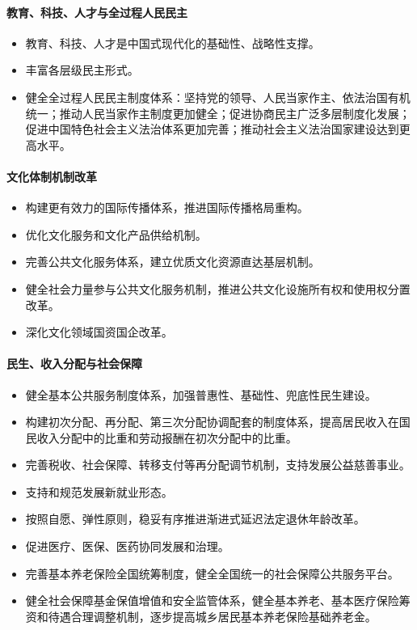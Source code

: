 \documentclass[12pt,a4paper]{ctexart}
\begin{document}
\paragraph{教育、科技、人才与全过程人民民主}

\begin{itemize}
\item 教育、科技、人才是中国式现代化的基础性、战略性支撑。
\item 丰富各层级民主形式。
\item 健全全过程人民民主制度体系：坚持党的领导、人民当家作主、依法治国有机统一；推动人民当家作主制度更加健全；促进协商民主广泛多层制度化发展；促进中国特色社会主义法治体系更加完善；推动社会主义法治国家建设达到更高水平。
\end{itemize}

\paragraph{文化体制机制改革}

\begin{itemize}
\item 构建更有效力的国际传播体系，推进国际传播格局重构。
\item 优化文化服务和文化产品供给机制。
\item 完善公共文化服务体系，建立优质文化资源直达基层机制。
\item 健全社会力量参与公共文化服务机制，推进公共文化设施所有权和使用权分置改革。
\item 深化文化领域国资国企改革。
\end{itemize}

\paragraph{民生、收入分配与社会保障}

\begin{itemize}
\item 健全基本公共服务制度体系，加强普惠性、基础性、兜底性民生建设。
\item 构建初次分配、再分配、第三次分配协调配套的制度体系，提高居民收入在国民收入分配中的比重和劳动报酬在初次分配中的比重。
\item 完善税收、社会保障、转移支付等再分配调节机制，支持发展公益慈善事业。
\item 支持和规范发展新就业形态。
\item 按照自愿、弹性原则，稳妥有序推进渐进式延迟法定退休年龄改革。
\item 促进医疗、医保、医药协同发展和治理。
\item 完善基本养老保险全国统筹制度，健全全国统一的社会保障公共服务平台。
\item 健全社会保障基金保值增值和安全监管体系，健全基本养老、基本医疗保险筹资和待遇合理调整机制，逐步提高城乡居民基本养老保险基础养老金。
\end{itemize}
\end{document}
